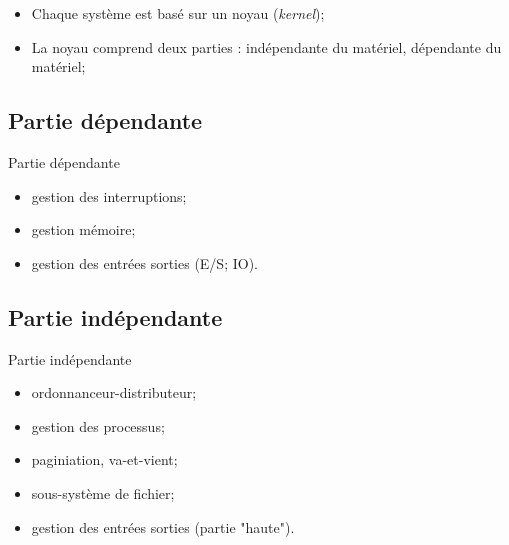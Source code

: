\begin{frame}{\sectitle}
\begin{block}{\subsectitle}
\begin{itemize}
    \item Chaque système est basé sur un noyau (\textit{kernel});
    \item La noyau comprend deux parties : indépendante du matériel, dépendante
    du matériel;
\end{itemize}
\end{block}

\def\subsectitle{Partie dépendante}
\subsection{\subsectitle}
\begin{block}{\subsectitle}
\begin{itemize}
    \item gestion des interruptions;
    \item gestion mémoire;
    \item gestion des entrées sorties (E/S; IO).
\end{itemize}

\end{block}
\end{frame}

\def\subsectitle{Partie indépendante}
\subsection{\subsectitle}

\begin{frame}{\sectitle}
\begin{block}{\subsectitle}
\begin{itemize}
    \item ordonnanceur-distributeur;
    \item gestion des processus;
    \item paginiation, va-et-vient;
    \item sous-système de fichier;
    \item gestion des entrées sorties (partie "haute").
\end{itemize}
\end{block}


\end{frame}


